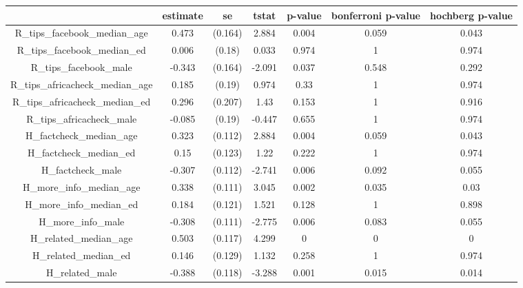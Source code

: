 \begin{tabular}{ccccccc}
  \hline
 & estimate & se & tstat & p-value & bonferroni p-value & hochberg p-value \\ 
  \hline
R\_tips\_facebook\_median\_age & 0.473 & (0.164) & 2.884 & 0.004 & 0.059 & 0.043 \\ 
  R\_tips\_facebook\_median\_ed & 0.006 & (0.18) & 0.033 & 0.974 & 1 & 0.974 \\ 
  R\_tips\_facebook\_male & -0.343 & (0.164) & -2.091 & 0.037 & 0.548 & 0.292 \\ 
  R\_tips\_africacheck\_median\_age & 0.185 & (0.19) & 0.974 & 0.33 & 1 & 0.974 \\ 
  R\_tips\_africacheck\_median\_ed & 0.296 & (0.207) & 1.43 & 0.153 & 1 & 0.916 \\ 
  R\_tips\_africacheck\_male & -0.085 & (0.19) & -0.447 & 0.655 & 1 & 0.974 \\ 
  H\_factcheck\_median\_age & 0.323 & (0.112) & 2.884 & 0.004 & 0.059 & 0.043 \\ 
  H\_factcheck\_median\_ed & 0.15 & (0.123) & 1.22 & 0.222 & 1 & 0.974 \\ 
  H\_factcheck\_male & -0.307 & (0.112) & -2.741 & 0.006 & 0.092 & 0.055 \\ 
  H\_more\_info\_median\_age & 0.338 & (0.111) & 3.045 & 0.002 & 0.035 & 0.03 \\ 
  H\_more\_info\_median\_ed & 0.184 & (0.121) & 1.521 & 0.128 & 1 & 0.898 \\ 
  H\_more\_info\_male & -0.308 & (0.111) & -2.775 & 0.006 & 0.083 & 0.055 \\ 
  H\_related\_median\_age & 0.503 & (0.117) & 4.299 & 0 & 0 & 0 \\ 
  H\_related\_median\_ed & 0.146 & (0.129) & 1.132 & 0.258 & 1 & 0.974 \\ 
  H\_related\_male & -0.388 & (0.118) & -3.288 & 0.001 & 0.015 & 0.014 \\ 
   \hline
\end{tabular}

